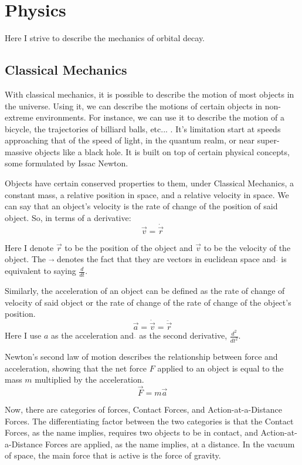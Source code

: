 \chapter{Physics}\label{ch:physics}

Here I strive to describe the mechanics of orbital decay.

\section{Classical Mechanics}

With classical mechanics, it is possible to describe the motion of most objects in the universe. Using it, we can describe the motions of certain objects in non-extreme environments. For instance, we can use it to describe the motion of a bicycle, the trajectories of billiard balls, etc... . It's limitation start at speeds approaching that of the speed of light, in the quantum realm, or near super-massive objects like a black hole. It is built on top of certain physical concepts, some formulated by Issac Newton.

Objects have certain conserved properties to them, under Classical Mechanics, a constant mass, a relative position in space, and a relative velocity in space. We can say that an object's velocity is the rate of change of the position of said object. So, in terms of a derivative: $$\vec{v}=\dot{\vec{r}}$$ 

Here I denote $\vec{r}$ to be the position of the object and $\vec{v}$ to be the velocity of the object. The $\vec{}$ denotes the fact that they are vectors in euclidean space and $\dot{}$ is equivalent to saying $\frac{d}{dt}$.

Similarly, the acceleration of an object can be defined as the rate of change of velocity of said object or the rate of change of the rate of change of the object's position. $$\vec{a}=\dot{\vec{v}}=\ddot{\vec{r}}$$ 
Here I use $a$ as the acceleration and $\ddot{}$ as the second derivative, $\frac{d^2}{dt^2}$.

Newton's second law of motion describes the relationship between force and acceleration, showing that the net force $F$ applied to an object is equal to the mass $m$ multiplied by the acceleration. 
\begin{equation}\label{eq:newton}
\vec{F}=m\vec{a}
\end{equation}

Now, there are categories of forces, Contact Forces, and Action-at-a-Distance Forces. The differentiating factor between the two categories is that the Contact Forces, as the name implies, requires two objects to be in contact, and Action-at-a-Distance Forces are applied, as the name implies, at a distance. In the vacuum of space, the main force that is active is the force of gravity.

